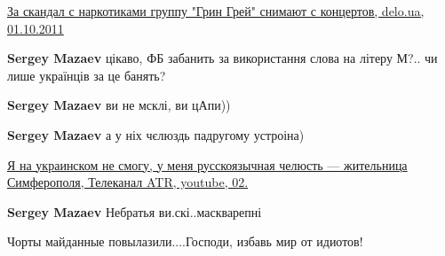 \begin{itemize}
\href{https://delo.ua/lifestyle/za-skandal-s-narkotikami-gruppu-grin-grej-snimajut-s-koncertov-165385/}{%
За скандал с наркотиками группу "Грин Грей" снимают с концертов, delo.ua, 01.10.2011%
}

 
\textbf{Sergey Mazaev} цікаво, ФБ забанить за використання слова на літеру М?.. чи лише українців за це банять?

 
\textbf{Sergey Mazaev} ви не мсклі, ви цАпи))

 
\textbf{Sergey Mazaev} а у ніх чєлюздь падругому устроіна)

\href{https://www.youtube.com/watch?v=Jx1nFTjlE7w}{%
Я на украинском не смогу, у меня русскоязычная челюсть — жительница Симферополя, %
Телеканал ATR, youtube, 02.
}

 
\textbf{Sergey Mazaev} Небратья ви.скі..маскварепні

 
Чорты майданные повылазили....Господи, избавь мир от идиотов!

 

\end{itemize}
